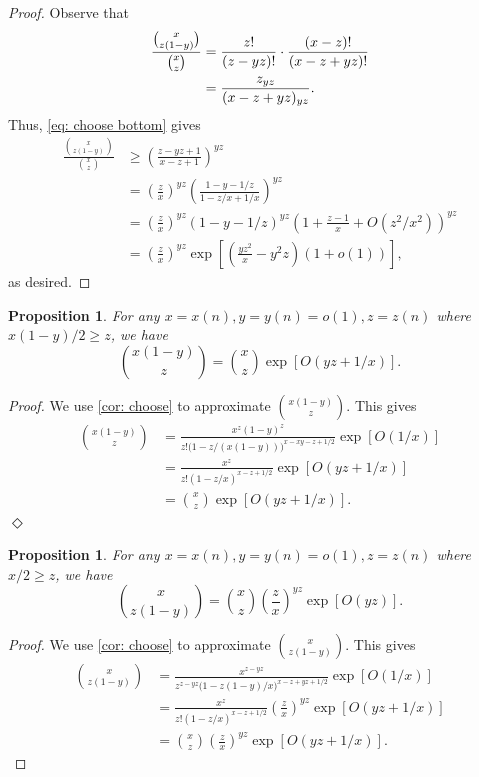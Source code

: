 \documentclass[11pt]{article}
\newenvironment{proofclaim}[1][]%
{\noindent \emph{Proof.} {}{#1}{}}{\hfill
	$\Diamond$\vspace{1em}}
\theoremstyle{plain}
\newtheorem{prop}[thm]{Proposition}
\begin{document}
\begin{proof}
    Observe that 
    \begin{align}
        \frac{\binom{x}{z(1-y)}}{\binom{x}{z}}&= \frac{z!}{(z - yz)!} \cdot \frac{(x - z)!}{(x - z + yz)!} \notag\\
        &= \frac{z_{yz}}{(x - z + yz)_{yz}}\label{eq: choose bottom}.
    \end{align}
    Thus, \eqref{eq: choose bottom} gives 
    \begin{align*}
        \frac{\binom{x}{z(1-y)}}{\binom{x}{z}} &\geq \left(\frac{z - yz + 1}{x - z + 1}\right)^{yz}\\
        &= \left(\frac{z}{x}\right)^{yz}\left(\frac{1 - y - 1/z}{1 - z/x + 1/x}\right)^{yz}\\
        &= \left(\frac{z}{x}\right)^{yz}\left(1 - y - 1/z\right)^{yz}\left(1 + \frac{z-1}{x} + O(z^2/x^2)\right)^{yz}\\
        &= \left(\frac z x \right)^{yz}\exp\left[\left(\frac{yz^2}{x} - y^2z\right)(1 + o(1))\right],
    \end{align*}
    as desired.
\end{proof}


    \begin{prop}\label{prop: choose approx ub top}
        For any $x = x(n),y = y(n) = o(1),z = z(n)$ where $x(1 - y)/2 \geq z$, we have 
        \[
        \binom{x(1 - y)}{z} = \binom{x}{z}\exp[O(yz + 1/x)].
        \]
    \end{prop}
    \begin{proofclaim}
        We use \cref{cor: choose} to approximate $\binom{x(1 - y)}{z}$. This gives 
        \begin{align*}
            \binom{x(1 - y)}{z} &= \frac{x^z(1 - y)^z}{z!\big(1 - z/(x(1-y))\big)^{x - xy - z + 1/2}}\exp[O(1/x)]\\
            &= \frac{x^z}{z!(1 - z/x)^{x - z + 1/2}}\exp[O(yz + 1/x)]\\
            &= \binom{x}{z}\exp[O(yz + 1/x)].
        \end{align*}
    \end{proofclaim}

\begin{prop}\label{prop: choose approx ub bot}
    For any $x = x(n), y = y(n) = o(1), z = z(n)$ where $x/2 \geq z$, we have 
    \[
    \binom{x}{z(1 - y)}= \binom{x}{z}\left(\frac{z}{x}\right)^{yz}\exp[O(yz)].
    \]
\end{prop}
\begin{proof}
    We use \cref{cor: choose} to approximate $\binom{x}{z(1 - y)}$. This gives 
        \begin{align*}
            \binom{x}{z(1-y)} &= \frac{x^{z - yz}}{z^{z - yz}\big(1 - z(1-y)/x\big)^{x - z + yz+ 1/2}}\exp[O(1/x)]\\
            &= \frac{x^z}{z!(1 - z/x)^{x - z + 1/2}}\left(\frac{z}{x}\right)^{yz}\exp[O(yz + 1/x)]\\
            &= \binom{x}{z}\left(\frac{z}{x}\right)^{yz}\exp[O(yz + 1/x)].
        \end{align*}
\end{proof}
\end{document}
